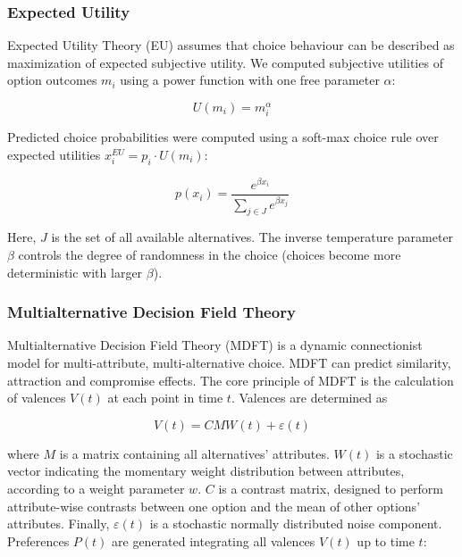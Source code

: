 \documentclass[11pt, a4paper]{article}
\begin{document}
\subsubsection*{Expected Utility}

Expected Utility Theory (EU) \autocite{vonneumann1947TheoryGamesEconomic} assumes that choice behaviour can be described as maximization of expected subjective utility. We computed subjective utilities of option outcomes $m_i$ using a power function with one free parameter $\alpha$:

\begin{equation}
    \label{eq:utility}
    U(m_i) = m_i^\alpha
\end{equation}

Predicted choice probabilities were computed using a soft-max choice rule \autocite{sutton2018ReinforcementLearningIntroduction} over expected utilities $x_i^{EU} = p_i \cdot U(m_i)$:

\begin{equation}
    \label{eq:softmax}
    p(x_i) = \frac{e^{\beta x_i}}{\sum_{j \in J}{e^{\beta x_j}}}
\end{equation}

Here, $J$ is the set of all available alternatives. The inverse temperature parameter $\beta$ controls the degree of randomness in the choice (choices become more deterministic with larger $\beta$).

\subsubsection*{Multialternative Decision Field Theory}

Multialternative Decision Field Theory (MDFT) \autocite{roe2001MultialternativeDecisionField} is a dynamic connectionist model for multi-attribute, multi-alternative choice. MDFT can predict similarity, attraction and compromise effects. The core principle of MDFT is the calculation of valences $V(t)$ at each point in time $t$. Valences are determined as

\begin{equation}
    \label{eq:mdft:v}
    V(t) = C M W(t) + \varepsilon(t)
\end{equation}

where $M$ is a matrix containing all alternatives' attributes. $W(t)$ is a stochastic vector indicating the momentary weight distribution between attributes, according to a weight parameter $w$. $C$ is a contrast matrix, designed to perform attribute-wise contrasts between one option and the mean of other options' attributes. Finally, $\varepsilon(t)$ is a stochastic normally distributed noise component. Preferences $P(t)$ are generated integrating all valences $V(t)$ up to time $t$:
\end{document}
